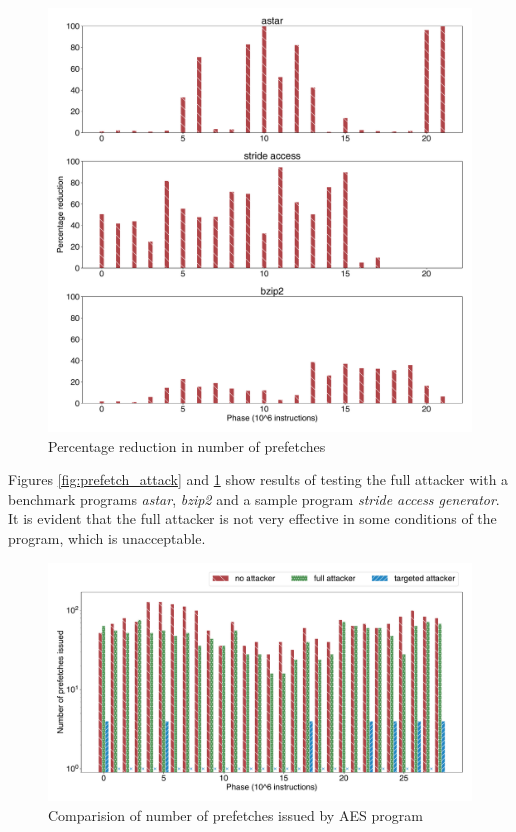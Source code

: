 \documentclass[conference]{IEEEtran}
\begin{document}
\begin{figure}[htbp]
    \centering
    \includegraphics[width=\columnwidth]{hwpf_perc}
    \caption{Percentage reduction in number of prefetches}
    \label{fig:prefetch_percred}
\end{figure}

Figures \ref{fig:prefetch_attack} and \ref{fig:prefetch_percred} show
results of testing the full attacker with a benchmark programs \textit{astar},
\textit{bzip2} and a sample program \textit{stride access generator}.
It is evident that the full attacker is not very effective in some
conditions of the program, which is unacceptable.

\begin{figure}[htbp]
    \centering
    \includegraphics[width=\columnwidth]{pf_issued}
    \caption{Comparision of number of prefetches issued by AES program}
    \label{fig:targeted_attack}
\end{figure}
\end{document}
